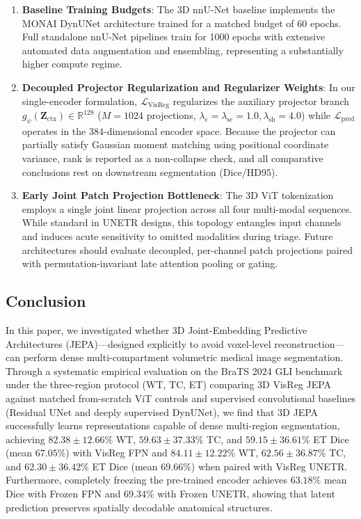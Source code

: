 \documentclass{article}
\begin{document}
\begin{enumerate}
    \item \textbf{Baseline Training Budgets}: The 3D nnU-Net baseline implements the MONAI DynUNet architecture trained for a matched budget of 60 epochs. Full standalone nnU-Net pipelines train for 1000 epochs with extensive automated data augmentation and ensembling, representing a substantially higher compute regime.
    \item \textbf{Decoupled Projector Regularization and Regularizer Weights}: In our single-encoder formulation, $\mathcal{L}_{\text{VisReg}}$ regularizes the auxiliary projector branch $g_\psi(\mathbf{Z}_{\text{ctx}}) \in \mathbb{R}^{128}$ ($M=1024$ projections, $\lambda_{\text{c}}=\lambda_{\text{sc}}=1.0, \lambda_{\text{sh}}=4.0$) while $\mathcal{L}_{\text{pred}}$ operates in the $384$-dimensional encoder space. Because the projector can partially satisfy Gaussian moment matching using positional coordinate variance, rank is reported as a non-collapse check, and all comparative conclusions rest on downstream segmentation (Dice/HD95).
    \item \textbf{Early Joint Patch Projection Bottleneck}: The 3D ViT tokenization employs a single joint linear projection across all four multi-modal sequences. While standard in UNETR designs, this topology entangles input channels and induces acute sensitivity to omitted modalities during triage. Future architectures should evaluate decoupled, per-channel patch projections paired with permutation-invariant late attention pooling or gating.
\end{enumerate}

\subsection{Conclusion}
\label{sec:conclusion}

In this paper, we investigated whether 3D Joint-Embedding Predictive Architectures (JEPA)---designed explicitly to avoid voxel-level reconstruction---can perform dense multi-compartment volumetric medical image segmentation. Through a systematic empirical evaluation on the BraTS 2024 GLI benchmark under the three-region protocol (WT, TC, ET) comparing 3D VisReg JEPA against matched from-scratch ViT controls and supervised convolutional baselines (Residual UNet and deeply supervised DynUNet), we find that 3D JEPA successfully learns representations capable of dense multi-region segmentation, achieving $82.38 \pm 12.66\%$ WT, $59.63 \pm 37.33\%$ TC, and $59.15 \pm 36.61\%$ ET Dice (mean $67.05\%$) with VisReg FPN and $84.11 \pm 12.22\%$ WT, $62.56 \pm 36.87\%$ TC, and $62.30 \pm 36.42\%$ ET Dice (mean $69.66\%$) when paired with VisReg UNETR. Furthermore, completely freezing the pre-trained encoder achieves $63.18\%$ mean Dice with Frozen FPN and $69.34\%$ with Frozen UNETR, showing that latent prediction preserves spatially decodable anatomical structures.
\end{document}
